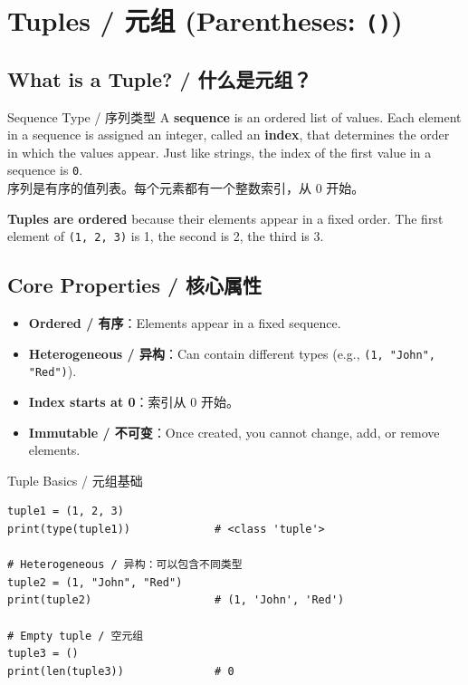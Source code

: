 \documentclass[11pt,a4paper]{article}
\begin{document}
\section{Tuples / 元组 (Parentheses: \texttt{()})}

\subsection{What is a Tuple? / 什么是元组？}

\begin{concept}{Sequence Type / 序列类型}
    A \textbf{sequence} is an ordered list of values. Each element in a sequence is assigned an integer, called an \textbf{index}, that determines the order in which the values appear. Just like strings, the index of the first value in a sequence is \texttt{0}. \\
    序列是有序的值列表。每个元素都有一个整数索引，从 0 开始。

    \textbf{Tuples are ordered} because their elements appear in a fixed order. The first element of \texttt{(1, 2, 3)} is 1, the second is 2, the third is 3.
\end{concept}

\subsection{Core Properties / 核心属性}

\begin{itemize}[itemsep=0.5em]
    \item \textbf{Ordered / 有序}：Elements appear in a fixed sequence.
    \item \textbf{Heterogeneous / 异构}：Can contain different types (e.g., \texttt{(1, "John", "Red")}).
    \item \textbf{Index starts at 0}：索引从 0 开始。
    \item \textbf{Immutable / 不可变}：Once created, you cannot change, add, or remove elements.
\end{itemize}

\begin{examplebox}{Tuple Basics / 元组基础}
\begin{lstlisting}
tuple1 = (1, 2, 3)
print(type(tuple1))             # <class 'tuple'>

# Heterogeneous / 异构：可以包含不同类型
tuple2 = (1, "John", "Red")
print(tuple2)                   # (1, 'John', 'Red')

# Empty tuple / 空元组
tuple3 = ()
print(len(tuple3))              # 0
\end{lstlisting}
\end{examplebox}
\end{document}
